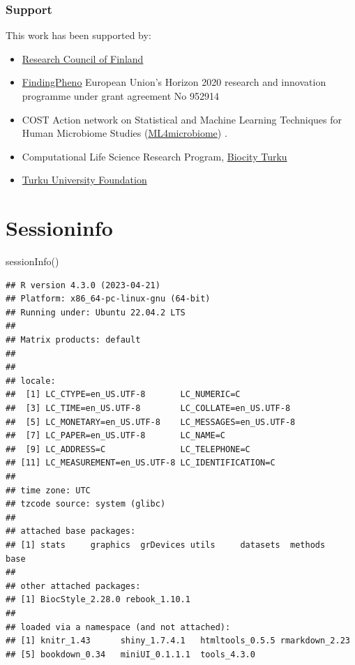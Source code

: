\documentclass[
]{book}
\newenvironment{Shaded}{\begin{snugshade}}{\end{snugshade}}
\newcommand{\FunctionTok}[1]{\textcolor[rgb]{0.00,0.00,0.00}{#1}}
\newcommand{\NormalTok}[1]{#1}
\begin{document}
\hypertarget{support}{%
\subsection*{Support}\label{support}}

This work has been supported by:

\begin{itemize}
\item
  \href{https://www.aka.fi/}{Research Council of Finland}
\item
  \href{https://www.findingpheno.eu/}{FindingPheno} European Union's Horizon 2020 research and innovation programme under grant agreement No 952914
\item
  COST Action network on Statistical and Machine Learning Techniques for Human Microbiome Studies
  (\href{https://www.ml4microbiome.eu/}{ML4microbiome}) \citep{MorenoIndias2021}.
\item
  Computational Life Science Research Program, \href{https://biocityturku.fi/}{Biocity Turku}
\item
  \href{https://www.yliopistosaatio.fi/en/}{Turku University Foundation}
\end{itemize}

\hypertarget{sessioninfo}{%
\chapter*{Sessioninfo}\label{sessioninfo}}

\begin{Shaded}
\begin{Highlighting}[]
\FunctionTok{sessionInfo}\NormalTok{()}
\end{Highlighting}
\end{Shaded}

\begin{verbatim}
## R version 4.3.0 (2023-04-21)
## Platform: x86_64-pc-linux-gnu (64-bit)
## Running under: Ubuntu 22.04.2 LTS
## 
## Matrix products: default
## 
## 
## locale:
##  [1] LC_CTYPE=en_US.UTF-8       LC_NUMERIC=C              
##  [3] LC_TIME=en_US.UTF-8        LC_COLLATE=en_US.UTF-8    
##  [5] LC_MONETARY=en_US.UTF-8    LC_MESSAGES=en_US.UTF-8   
##  [7] LC_PAPER=en_US.UTF-8       LC_NAME=C                 
##  [9] LC_ADDRESS=C               LC_TELEPHONE=C            
## [11] LC_MEASUREMENT=en_US.UTF-8 LC_IDENTIFICATION=C       
## 
## time zone: UTC
## tzcode source: system (glibc)
## 
## attached base packages:
## [1] stats     graphics  grDevices utils     datasets  methods   base     
## 
## other attached packages:
## [1] BiocStyle_2.28.0 rebook_1.10.1   
## 
## loaded via a namespace (and not attached):
## [1] knitr_1.43      shiny_1.7.4.1   htmltools_0.5.5 rmarkdown_2.23 
## [5] bookdown_0.34   miniUI_0.1.1.1  tools_4.3.0
\end{verbatim}

  
\end{document}
